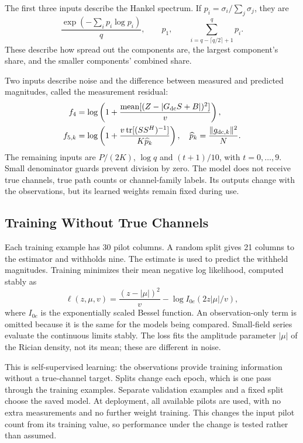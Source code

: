 \documentclass[journal]{IEEEtran}
\DeclareMathOperator{\tr}{tr}
\begin{document}
The first three inputs describe the Hankel spectrum. If
$p_i=\sigma_i/\sum_j\sigma_j$, they are
\begin{equation}
 \frac{\exp(-\sum_i p_i\log p_i)}{q},\qquad p_1,\qquad
 \sum_{i=q-\lceil q/2\rceil+1}^{q}p_i.
\end{equation}
These describe how spread out the components are, the largest component's
share, and the smaller components' combined share.

Two inputs describe noise and the difference between measured and predicted
magnitudes, called the measurement residual:
\begin{align}
 f_4&=\log\left(1+\frac{\operatorname{mean}[(Z-|G_{\rm dc}S+B|)^2]}{v}\right),\\
 f_{5,k}&=\log\left(1+\frac{v\tr[(SS^H)^{-1}]}{K\widehat p_k}\right),
 \quad \widehat p_k=\frac{\|g_{{\rm dc},k}\|^2}{N}.
\end{align}
The remaining inputs are $P/(2K)$, $\log q$ and $(t+1)/10$, with
$t=0,\ldots,9$. Small denominator guards prevent division by zero.
The model does not receive true channels, true path counts or channel-family
labels. Its outputs change with the observations, but its learned weights
remain fixed during use.

\subsection{Training Without True Channels}
Each training example has 30 pilot columns. A random split gives 21 columns
to the estimator and withholds nine. The estimate is used to predict the
withheld magnitudes. Training minimizes their mean negative log likelihood,
computed stably as
\begin{equation}
 \ell(z,\mu,v)=\frac{(z-|\mu|)^2}{v}
 -\log I_{0e}(2z|\mu|/v),
\end{equation}
where $I_{0e}$ is the exponentially scaled Bessel function. An observation-only
term is omitted because it is the same for the models being compared.
Small-field series evaluate the continuous limits stably. The loss fits
the amplitude parameter $|\mu|$ of the Rician density, not its mean;
these are different in noise.

This is self-supervised learning: the observations provide training
information without a true-channel target. Splits change each epoch, which
is one pass through the training examples. Separate validation examples and
a fixed split choose the saved model. At deployment, all available pilots
are used, with no extra measurements and no further weight training. This
changes the input pilot count from its training value, so performance under
the change is tested rather than assumed.
\end{document}
